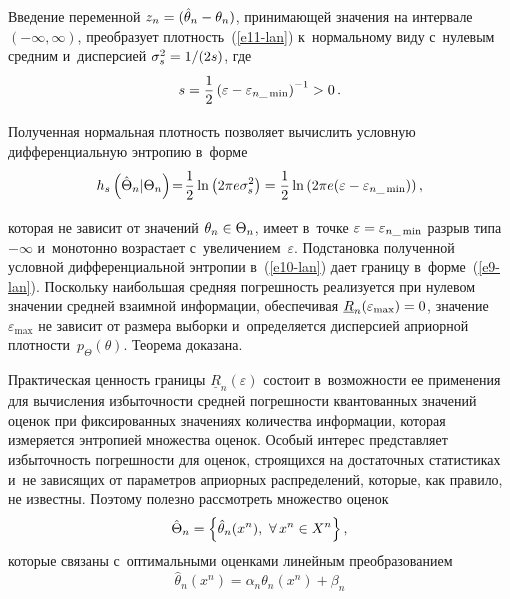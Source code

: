 \begin{multicols}{2}
Введение переменной $z_n\hm= (\hat{\theta}_n-\theta_n)$, при\-ни\-ма\-ющей значения на интервале 
$(-\infty, \infty)$, преобразует плот\-ность~(\ref{e11-lan}) к~нормальному виду с~нулевым средним 
и~дисперсией $\sigma_s^2\hm= 1/(2s)$, где 
$$
s= \displaystyle\frac{\displaystyle 1\mathstrut}{\displaystyle 2\mathstrut}\left(\varepsilon-\varepsilon_{n\_\min}\right)^{-1}>0\,.
$$

\vspace*{-2pt}

\noindent
 Полученная нормальная плот\-ность поз\-во\-ля\-ет вы\-чис\-лить 
условную дифференциальную энтропию в~форме 
$$
h_s\left(\hat{\Theta}_n\vert \Theta_n\right) \!=\! \displaystyle\frac{\displaystyle 1\mathstrut}{\displaystyle 2\mathstrut} 
\ln \left(2\pi e \sigma_s^2\right)= \displaystyle\frac{\displaystyle 1\mathstrut}{\displaystyle 2\mathstrut} \ln \left(2\pi e (\varepsilon- \varepsilon_{n\_\min})\right),
$$

\vspace*{-2pt}

\noindent
 которая не 
зависит от значений $\theta_n\hm\in \Theta_n$, имеет в~точ\-ке $\varepsilon\hm= 
\varepsilon_{n\_\min}$ разрыв типа~$-\infty$ и~монотонно воз\-рас\-та\-ет 
с~увеличением~$\varepsilon$. Под\-ста\-нов\-ка полученной услов\-ной дифференциальной энтропии 
в~(\ref{e10-lan}) дает границу в~форме~(\ref{e9-lan}). Поскольку наибольшая средняя 
по\-греш\-ность реализуется при нулевом значении средней взаимной информации, обеспечивая 
$\underline{R}_n(\varepsilon_{\max})\hm=0$, значение~$\varepsilon_{\max}$ не зависит от 
размера выборки и~определяется дисперсией априорной плот\-ности~$p_{\Theta}(\theta)$. 
Тео\-ре\-ма доказана. 

\smallskip

Практическая ценность границы $\underline{R}_n(\varepsilon)$ со\-сто\-ит в~воз\-мож\-ности ее 
применения для вычисления из\-бы\-точ\-ности средней по\-греш\-ности квантованных значений 
оценок при фиксированных \mbox{значениях} количества информации, которая измеряется энт\-ро\-пи\-ей 
множества оценок. Особый интерес пред\-став\-ля\-ет из\-бы\-точ\-ность по\-греш\-ности для оценок, 
строящихся на достаточных статистиках и~не зависящих от па\-ра\-мет\-ров априорных 
распределений, которые, как правило, не известны. Поэтому полезно рассмотреть множество 
оценок 
$$
\hat{\Theta}_n= \left\{ \hat{\theta}_n(x^n),\ \forall\,x^n\hm\in X^n\right\},
$$
 которые 
связаны с~оптимальными оценками линейным преобразованием
\begin{equation}
\hat{\theta}_n(x^n) =\alpha_n \theta_n(x^n) +\beta_n
\label{e12-lan}
\end{equation}

\vspace*{-2pt}


\end{multicols}
